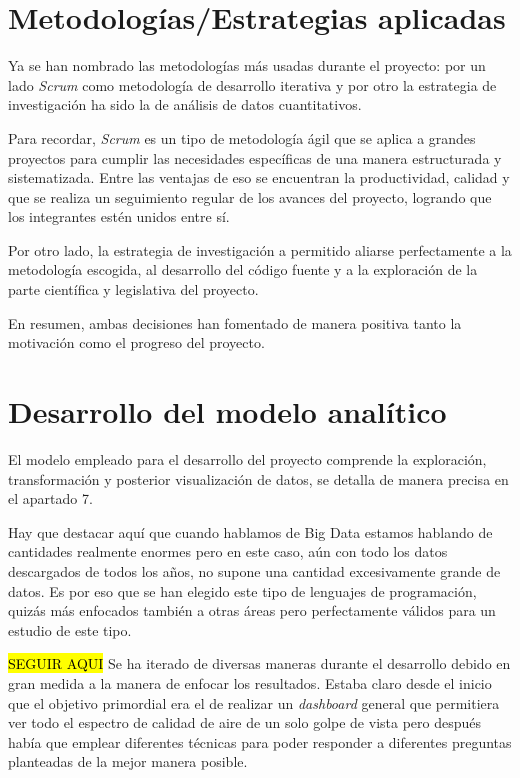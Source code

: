 \section{Metodologías/Estrategias aplicadas}\label{metodologia}

Ya se han nombrado las metodologías más usadas durante el proyecto: por un lado \textit{Scrum} como metodología de desarrollo iterativa y por otro la estrategia de investigación ha sido la de análisis de datos cuantitativos. 

Para recordar, \textit{Scrum} es un tipo de metodología ágil que se aplica a grandes proyectos para cumplir las necesidades específicas de una manera estructurada y sistematizada. Entre las ventajas de eso se encuentran la productividad, calidad y que se realiza un seguimiento regular de los avances del proyecto, logrando que los integrantes estén unidos entre sí.

Por otro lado, la estrategia de investigación a permitido aliarse perfectamente a la metodología escogida, al desarrollo del código fuente y a la exploración de la parte científica y legislativa del proyecto.

En resumen, ambas decisiones han fomentado de manera positiva tanto la motivación como el progreso del proyecto.


\section{Desarrollo del modelo analítico}\label{algoritmo}
El modelo empleado para el desarrollo del proyecto comprende la exploración, transformación y posterior visualización de datos, se detalla de manera precisa en el apartado 7. 

Hay que destacar aquí que cuando hablamos de Big Data estamos hablando de cantidades realmente enormes pero en este caso, aún con todo los datos descargados de todos los años, no supone una cantidad excesivamente grande de datos. Es por eso que se han elegido este tipo de lenguajes de programación, quizás más enfocados también a otras áreas pero perfectamente válidos para un estudio de este tipo.

 \hl{SEGUIR AQUI}
Se ha iterado de diversas maneras durante el desarrollo debido en gran medida a la manera de enfocar los resultados. Estaba claro desde el inicio que el objetivo primordial era el de realizar un \textit{dashboard} general que permitiera ver todo el espectro de calidad de aire de un solo golpe de vista pero después había que emplear diferentes técnicas para poder responder a diferentes preguntas planteadas de la mejor manera posible. 



